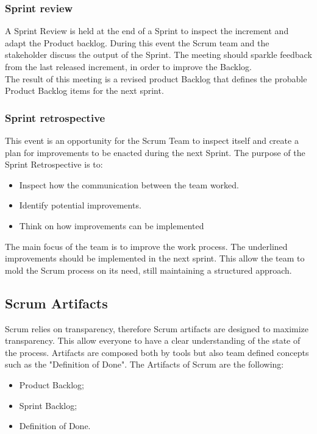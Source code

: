 \documentclass[../main.tex]{subfiles}
\begin{document}
\subsubsection{Sprint review}
A Sprint Review is held at the end of a Sprint to inspect the increment and adapt the Product backlog. During this event the Scrum team and the stakeholder discuss the output of the Sprint. The meeting should sparkle feedback from the last released increment, in order to improve the Backlog.\\
The result of this meeting is a revised product Backlog that defines the probable Product Backlog items for the next sprint.
\subsubsection{Sprint retrospective}
This event is an opportunity for the Scrum Team to inspect itself and create a plan for improvements to be enacted during the next Sprint. The purpose of the Sprint Retrospective is to:
\begin{itemize}
    \item Inspect how the communication between the team worked.
    \item Identify potential improvements.
    \item Think on how improvements can be implemented
\end{itemize}
The main focus of the team is to improve the work process. The underlined improvements should be implemented in the next sprint. This allow the team to mold the Scrum process on its need, still maintaining a structured approach. 
\subsection{Scrum Artifacts}
Scrum relies on transparency, therefore Scrum artifacts are designed to maximize transparency. This allow everyone to have a clear understanding of the state of the process.
Artifacts are composed both by tools but also team defined concepts such as the "Definition of Done". The Artifacts of Scrum are the following:
\begin{itemize}
    \item Product Backlog;
    \item Sprint Backlog;
    \item Definition of Done. 
\end{itemize}
\end{document}
